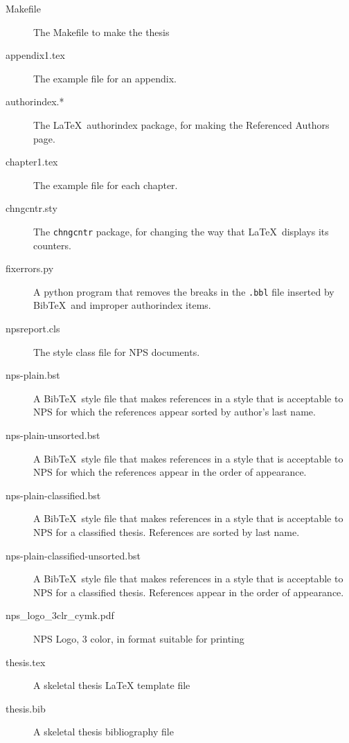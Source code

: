 \begin{description}
\item[Makefile] The Makefile to make the thesis

\item[appendix1.tex] The example file for an appendix.

\item[authorindex.*] The \LaTeX~authorindex package, for making
the Referenced Authors page.

\item[chapter1.tex] The example file for each chapter.

\item[chngcntr.sty] The \texttt{chngcntr} package, for changing
the way that \LaTeX~displays its counters.

\item[fixerrors.py] A python program that removes the breaks in the
\texttt{.bbl} file inserted by Bib\TeX~and improper authorindex items.

\item[npsreport.cls] The style class file for NPS documents.

\item[nps-plain.bst] A Bib\TeX~style file that makes references in a style that is acceptable to NPS for which the references appear sorted by author's last name.

\item[nps-plain-unsorted.bst] A Bib\TeX~style file that makes
  references in a style that is acceptable to NPS for which the
  references appear in  the order of appearance.

\item[nps-plain-classified.bst] A Bib\TeX~style file that makes references in a style that is acceptable to NPS for a classified thesis. References are sorted by last name.

\item[nps-plain-classified-unsorted.bst] A Bib\TeX~style file that makes references in a style that is acceptable to NPS for a classified thesis. References appear in the order of appearance.

\item[nps\_logo\_3clr\_cymk.pdf] NPS Logo, 3 color, in format suitable for printing

\item[thesis.tex] A skeletal thesis \LaTeX{} template file

\item[thesis.bib] A skeletal thesis bibliography file
\end{description}

